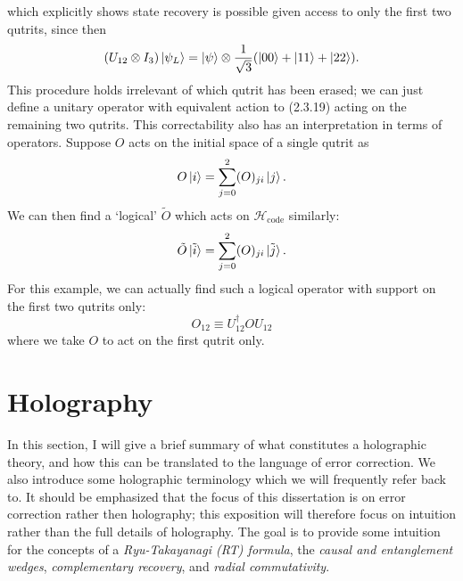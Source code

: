 \documentclass[12pt,a4paper]{report}
\numberwithin{equation}{section}
\newcommand{\Hcode}{\mathcal{H}_{\text{code}}}
\theoremstyle{definition}
\theoremstyle{theorem}
\theoremstyle{theorem}
\theoremstyle{example}
\theoremstyle{definition}
\begin{document}
which explicitly shows state recovery is possible given access to only the first two qutrits, since then
\begin{equation}
	(U_{12}\otimes I_{3})\ket{\psi_{L}}=\ket{\psi}\otimes\frac{1}{\sqrt{3}}(\ket{00}+\ket{11}+\ket{22}).
\end{equation}
This procedure holds irrelevant of which qutrit has been erased; we can just define a unitary operator with equivalent action to (2.3.19) acting on the remaining two qutrits. This correctability also has an interpretation in terms of operators. Suppose $O$ acts on the initial space of a single qutrit as
\begin{equation}
	O\ket{i}=\sum_{j=0}^{2}(O)_{ji}\ket{j}.
\end{equation}
We can then find a `logical' $\tilde{O}$ which acts on $\Hcode$ similarly:
\begin{equation}
	\tilde{O}\ket{\tilde{i}}=\sum_{j=0}^{2}(O)_{ji}\ket{\tilde{j}}.
\end{equation}
For this example, we can actually find such a logical operator with support on the first two qutrits only:
\begin{equation}
	O_{12}\equiv U_{12}^{\dagger}OU_{12}
\end{equation}
where we take $O$ to act on the first qutrit only. 

\section{Holography}
In this section, I will give a brief summary of what constitutes a holographic theory, and how this can be translated to the language of error correction. We also introduce some holographic terminology which we will frequently refer back to. It should be emphasized that the focus of this dissertation is on error correction rather then holography; this exposition will therefore focus on intuition rather than the full details of holography. The goal is to provide some intuition for the concepts of a \textit{Ryu-Takayanagi (RT) formula}, the \textit{causal and entanglement wedges}, \textit{complementary recovery}, and \textit{radial commutativity}.
\end{document}
